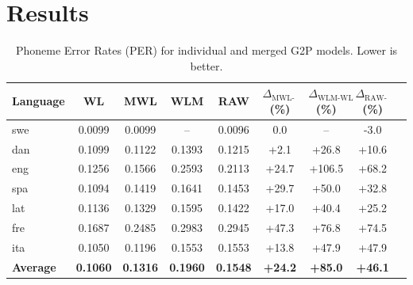 \documentclass[10pt, a4paper]{article}
\begin{document}








\section{Results}

\begin{table}[ht]
\centering
\caption{Phoneme Error Rates (PER) for individual and merged G2P models. Lower is better.}
\label{tab:per_results}
\begin{tabular}{lcccccccc}
\toprule
\textbf{Language} & \textbf{WL} & \textbf{MWL} & \textbf{WLM} & \textbf{RAW} &
$\Delta_{\text{MWL-WL}}$ (\%) & $\Delta_{\text{WLM-WL}}$ (\%) & $\Delta_{\text{RAW-WL}}$ (\%) \\
\midrule
swe & 0.0099 & 0.0099 & --      & 0.0096 & 0.0  & --   & -3.0 \\
dan & 0.1099 & 0.1122 & 0.1393  & 0.1215 & +2.1 & +26.8 & +10.6 \\
eng & 0.1256 & 0.1566 & 0.2593  & 0.2113 & +24.7 & +106.5 & +68.2 \\
spa & 0.1094 & 0.1419 & 0.1641  & 0.1453 & +29.7 & +50.0 & +32.8 \\
lat & 0.1136 & 0.1329 & 0.1595  & 0.1422 & +17.0 & +40.4 & +25.2 \\
fre & 0.1687 & 0.2485 & 0.2983  & 0.2945 & +47.3 & +76.8 & +74.5 \\
ita & 0.1050 & 0.1196 & 0.1553  & 0.1553 & +13.8 & +47.9 & +47.9 \\
\midrule
\textbf{Average} & \textbf{0.1060} & \textbf{0.1316} & \textbf{0.1960} & \textbf{0.1548}
& \textbf{+24.2} & \textbf{+85.0} & \textbf{+46.1} \\
\bottomrule
\end{tabular}
\end{table}
\end{document}
